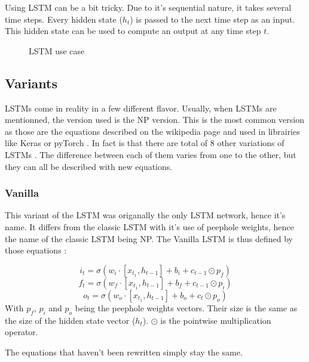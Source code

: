 Using \ac{LSTM} can be a bit tricky. Due to it's sequential nature, it takes several time steps. Every hidden state ($h_t$) is passed to the next time step as an input. This hidden state can be used to compute an output at any time step $t$.

\begin{figure}[H]
  \centering
  
  \caption{LSTM use case}
  \label{fig:lstmUse}
\end{figure}

\subsection{Variants}

\acp{LSTM} come in reality in a few different flavor. Usually, when \acp{LSTM} are mentionned, the version used is the \ac{NP} version. This is the most common version as those are the equations described on the wikipedia page \cite{wikiLSTM} and used in librairies like Keras \cite{Keras} or pyTorch \cite{PyTorch}. In fact is that there are total of 8 other variations of \acp{LSTM} \cite{nbLSTM}.
The difference between each of them varies from one to the other, but they can all be described with new equations.

\subsubsection{Vanilla}
This variant of the \ac{LSTM} was origanally the only \ac{LSTM} network, hence it's name. It differs from the classic \ac{LSTM} with it's use of peephole weights, hence the name of the classic \ac{LSTM} being \acf{NP}. The Vanilla \ac{LSTM} is thus defined by those equations \cite{vanillaLSTM, nbLSTM} :

\begin{equation}\label{eq:inputGVanilla}
  i_t=\sigma (w_i\cdot[x_{t_1},h_{t-1}] + b_i+c_{t-1}\odot p_f)
\end{equation}
\begin{equation}\label{eq:forgetGVanilla}
  f_t=\sigma (w_f\cdot[x_{t_1},h_{t-1}] + b_f+c_{t-1}\odot p_i)
\end{equation}
\begin{equation}\label{eq:ouputGVanilla}
  o_t=\sigma (w_o\cdot[x_{t_1},h_{t-1}] + b_o+c_{t}\odot p_o)
\end{equation}
With $p_f$, $p_i$ and $p_o$ being the peephole weights vectors. Their size is the same as the size of the hidden state vector ($h_t$). $\odot$ is the pointwise multiplication operator.

The equations that haven't been rewritten simply stay the same.
